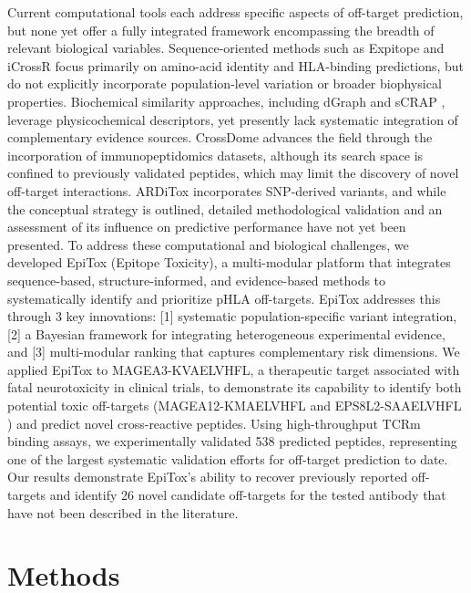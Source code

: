 \documentclass[times, twoside, watermark]{zHenriquesLab-StyleBioRxiv}
\begin{document}
    Current computational tools each address specific aspects of off-target prediction, but none yet offer a fully integrated framework encompassing the breadth of relevant biological variables. Sequence-oriented methods such as Expitope \cite{haase2015expitope} and iCrossR \cite{jaravine2017assessment} focus primarily on amino-acid identity and HLA-binding predictions, but do not explicitly incorporate population-level variation or broader biophysical properties. Biochemical similarity approaches, including dGraph \cite{braun2021dgraph} and sCRAP \cite{yarmarkovich2021retracted}, leverage physicochemical descriptors, yet presently lack systematic integration of complementary evidence sources. CrossDome \cite{fonseca2023crossdome} advances the field through the incorporation of immunopeptidomics datasets, although its search space is confined to previously validated peptides, which may limit the discovery of novel off-target interactions. ARDiTox \cite{murcia2025computational} incorporates SNP-derived variants, and while the conceptual strategy is outlined, detailed methodological validation and an assessment of its influence on predictive performance have not yet been presented.
    To address these computational and biological challenges, we developed EpiTox (Epitope Toxicity), a multi-modular platform that integrates sequence-based, structure-informed, and evidence-based methods to systematically identify and prioritize pHLA off-targets.
    EpiTox addresses this through 3 key innovations: [1] systematic population-specific variant integration, [2] a Bayesian framework for integrating heterogeneous experimental evidence, and [3] multi-modular ranking that captures complementary risk dimensions. 
    We applied EpiTox to MAGEA3-KVAELVHFL, a therapeutic target associated with fatal neurotoxicity in clinical trials, to demonstrate its capability to identify both potential toxic off-targets (MAGEA12-KMAELVHFL and EPS8L2-SAAELVHFL  \cite{morgan2013cancer, martin2021re}) and predict novel cross-reactive peptides. Using high-throughput TCRm binding assays, we experimentally validated 538 predicted peptides, representing one of the largest systematic validation efforts for off-target prediction to date. Our results demonstrate EpiTox's ability to recover previously reported off-targets and identify 26 novel candidate off-targets for the tested antibody that have not been described in the literature.

\section*{Methods}\label{methods} 
\end{document}
